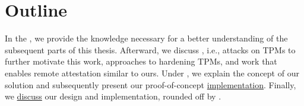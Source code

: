 \section{Outline}

In the , we provide the knowledge necessary for a better understanding of the subsequent parts of this thesis.
Afterward, we discuss , i.e., attacks on TPMs to further motivate this work, approaches to hardening TPMs, and work that enables remote attestation similar to ours.
Under , we explain the concept of our solution and subsequently present our proof-of-concept \hyperref[chapter:implementation]{implementation}.
Finally, we \hyperref[chapter:discussion]{discuss} our design and implementation, rounded off by .
